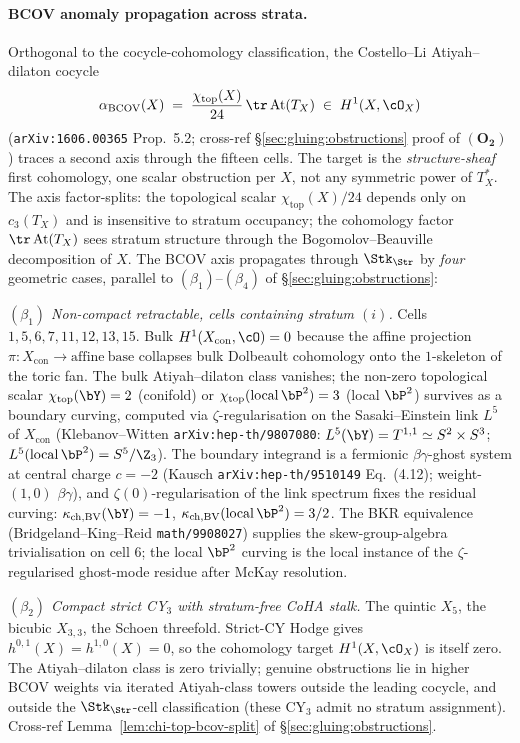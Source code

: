 \paragraph{BCOV anomaly propagation across strata.} Orthogonal to
the cocycle-cohomology classification, the Costello--Li
Atiyah--dilaton cocycle
\[
 \alpha_{\mathrm{BCOV}}(X)
 \;=\; \frac{\chi_{\mathrm{top}}(X)}{24}\,\tr\,\mathrm{At}(T_X)
 \;\in\; H^{1}(X,\cO_X)
\]
(\texttt{arXiv:1606.00365} Prop.~5.2; cross-ref
\S\ref{sec:gluing:obstructions} proof of $(\mathbf{O_2})$) traces a
second axis through the fifteen cells. The target is the
\emph{structure-sheaf} first cohomology, one scalar obstruction per
$X$, not any symmetric power of $T_X^\ast$. The axis factor-splits:
the topological scalar $\chi_{\mathrm{top}}(X)/24$ depends only on
$c_3(T_X)$ and is insensitive to stratum occupancy; the cohomology
factor $\tr\,\mathrm{At}(T_X)$ sees stratum structure through the
Bogomolov--Beauville decomposition of $X$. The BCOV axis propagates
through $\Stk_{\Str}$ by \emph{four} geometric cases, parallel to
$(\beta_1)$--$(\beta_4)$ of \S\ref{sec:gluing:obstructions}:

\emph{$(\beta_1)$ Non-compact retractable, cells containing stratum
$(i)$.} Cells $1, 5, 6, 7, 11, 12, 13, 15$. Bulk
$H^{1}(X_{\mathrm{con}},\cO)=0$ because the affine projection
$\pi:X_{\mathrm{con}}\to\mathrm{affine\ base}$ collapses bulk
Dolbeault cohomology onto the $1$-skeleton of the toric fan. The
bulk Atiyah--dilaton class vanishes; the non-zero topological
scalar $\chi_{\mathrm{top}}(\bY)=2$ (conifold) or
$\chi_{\mathrm{top}}(\mathrm{local}\,\bP^2)=3$ (local $\bP^2$)
survives as a boundary curving, computed via $\zeta$-regularisation
on the Sasaki--Einstein link $L^5$ of $X_{\mathrm{con}}$
(Klebanov--Witten \texttt{arXiv:hep-th/9807080}:
$L^5(\bY)=T^{1,1}\simeq S^2\times S^3$;
$L^5(\mathrm{local}\,\bP^2)=S^5/\Z_3$). The boundary integrand is a
fermionic $\beta\gamma$-ghost system at central charge $c=-2$
(Kausch \texttt{arXiv:hep-th/9510149} Eq.~(4.12); weight-$(1,0)$
$\beta\gamma$), and $\zeta(0)$-regularisation of the link spectrum
fixes the residual curving:
$\kappa_{\mathrm{ch,BV}}(\bY)=-1$,
$\kappa_{\mathrm{ch,BV}}(\mathrm{local}\,\bP^2)=3/2$. The BKR
equivalence (Bridgeland--King--Reid \texttt{math/9908027}) supplies
the skew-group-algebra trivialisation on cell $6$; the local
$\bP^2$ curving is the local instance of the $\zeta$-regularised
ghost-mode residue after McKay resolution.

\emph{$(\beta_2)$ Compact strict CY$_3$ with stratum-free CoHA stalk.}
The quintic $X_5$, the bicubic $X_{3,3}$, the Schoen
threefold. Strict-CY Hodge gives $h^{0,1}(X)=h^{1,0}(X)=0$, so the
cohomology target $H^1(X,\cO_X)$ is itself zero. The
Atiyah--dilaton class is zero trivially; genuine obstructions lie
in higher BCOV weights via iterated Atiyah-class towers outside the
leading cocycle, and outside the $\Stk_{\Str}$-cell classification
(these CY$_3$ admit no stratum assignment). Cross-ref
Lemma~\ref{lem:chi-top-bcov-split} of
\S\ref{sec:gluing:obstructions}.

